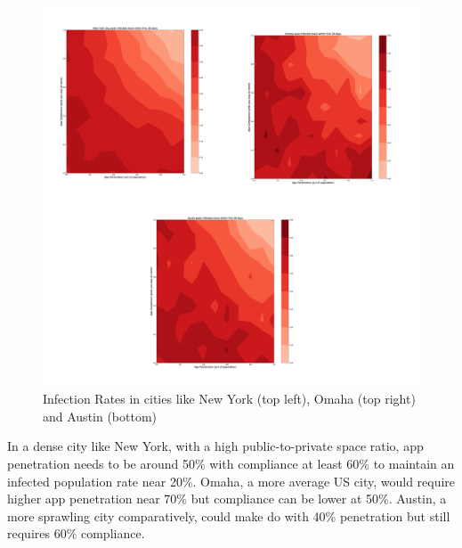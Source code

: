 \documentclass{article}
\begin{document}
\begin{figure} %
  \centering
  \includegraphics[scale=0.15]{Figure-2.png}
  \caption{Infection Rates in cities like New York (top left), Omaha (top right) and Austin (bottom)}
  \label{fig:fig2}
\end{figure}

In a dense city like New York, with a high public-to-private space ratio, app penetration needs to be around 50\% with compliance at least 60\% to maintain an infected population rate near 20\%. Omaha, a more average US city, would require higher app penetration near 70\% but compliance can be lower at 50\%. Austin, a more sprawling city comparatively, could make do with 40\% penetration but still requires 60\% compliance.
\end{document}
